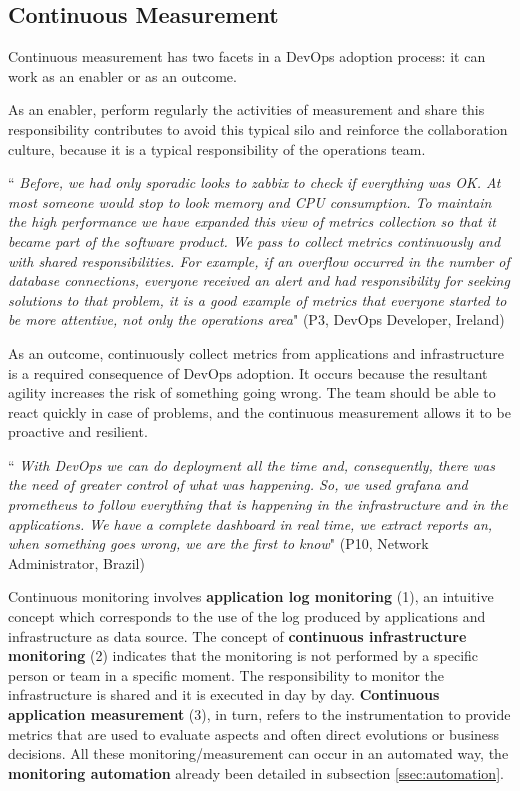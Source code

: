 \subsection{Continuous Measurement}
Continuous measurement has two facets in a DevOps adoption process: it can work
as an enabler or as an outcome.

As an enabler, perform regularly the activities of measurement and share this
responsibility contributes to avoid this typical silo and reinforce the
collaboration culture, because it is a typical responsibility of the operations
team.

\begin{mq}
``\emph{
Before, we had only sporadic looks to zabbix to check if everything was OK.
At most someone would stop to look memory and CPU consumption. To maintain the
high performance we have expanded this view of metrics collection so that it
became part of the software product. We pass to collect metrics continuously
and with shared responsibilities. For example, if an overflow occurred in the
number of database connections, everyone received an alert and had
responsibility for seeking solutions to that problem, it is a good example of
metrics that everyone started to be more attentive, not only the operations
area}" (P3, DevOps Developer, Ireland)
\end{mq}

As an outcome, continuously collect metrics from applications and
infrastructure is a required consequence of DevOps adoption. It occurs because
the resultant agility increases the risk of something going wrong. The team
should be able to react quickly in case of problems, and the continuous
measurement allows it to be proactive and resilient.

\begin{mq}
``\emph{
With DevOps we can do deployment all the time and, consequently, there was
the need of greater control of what was happening. So, we used grafana and
prometheus to follow everything that is happening in the infrastructure and in
the applications. We have a complete dashboard in real time, we extract reports
an, when something goes wrong, we are the first to know}" (P10, Network
Administrator, Brazil)
\end{mq}

Continuous monitoring involves \textbf{application log monitoring} (1), an
intuitive concept which corresponds to the use of the log produced by
applications and infrastructure as data source. The concept of
\textbf{continuous infrastructure monitoring} (2) indicates that the monitoring
is not performed by a specific person or team in a specific moment. The
responsibility to monitor the infrastructure is shared and it is executed in
day by day. \textbf{Continuous application measurement} (3), in turn, refers to
the instrumentation to provide metrics that are used to evaluate aspects and
often direct evolutions or business decisions. All these monitoring/measurement
can occur in an automated way, the \textbf{monitoring automation} already been
detailed in subsection \ref{ssec:automation}.

